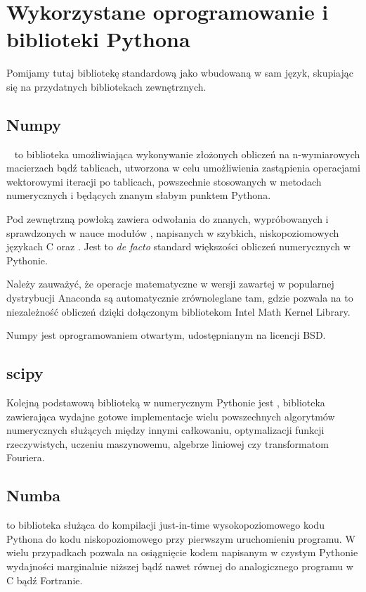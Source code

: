 \section{Wykorzystane oprogramowanie i biblioteki Pythona}

Pomijamy tutaj bibliotekę standardową jako wbudowaną w sam język, skupiając się na przydatnych bibliotekach zewnętrznych.

\subsection{Numpy}
~\cite{numpy} to biblioteka umożliwiająca wykonywanie złożonych obliczeń na
n-wymiarowych macierzach bądź tablicach, utworzona w celu umożliwienia
zastąpienia operacjami wektorowymi iteracji po tablicach, powszechnie
stosowanych w metodach numerycznych i będących znanym słabym punktem
Pythona.

Pod zewnętrzną powłoką zawiera odwołania do znanych, wypróbowanych i
sprawdzonych w nauce modułów ,  napisanych w
szybkich, niskopoziomowych językach C oraz .  Jest to
\emph{de facto} standard większości obliczeń numerycznych w Pythonie.

Należy zauważyć, że operacje matematyczne w wersji  zawartej
w popularnej dystrybucji Anaconda są automatycznie zrównoleglane tam, gdzie
pozwala na to niezależność obliczeń dzięki dołączonym bibliotekom Intel Math
Kernel Library.\cite{intel-mkl} 

Numpy jest oprogramowaniem otwartym, udostępnianym na licencji BSD\@.


\subsection{scipy}
Kolejną podstawową biblioteką w numerycznym Pythonie jest \cite{scipy},
biblioteka zawierająca wydajne gotowe implementacje wielu powszechnych algorytmów
numerycznych służących między innymi całkowaniu, optymalizacji funkcji rzeczywistych,
uczeniu maszynowemu, algebrze liniowej czy transformatom Fouriera.

\subsection{Numba}
 to biblioteka służąca do kompilacji just-in-time wysokopoziomowego
kodu Pythona do kodu niskopoziomowego przy pierwszym uruchomieniu programu. W
wielu przypadkach pozwala na osiągnięcie kodem napisanym w czystym Pythonie
wydajności marginalnie niższej bądź nawet równej do analogicznego programu w C
bądź Fortranie.~\cite{numba}

